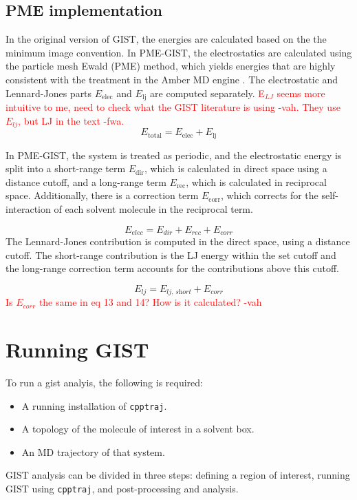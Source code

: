 \documentclass[9pt,tutorial]{livecoms}
\newcommand{\software}{\texttt}
\newcommand{\todo}{\textcolor{red}}
\begin{document}
\subsection{PME implementation}

In the original version of GIST, the energies are calculated based on the the minimum image convention.
In PME-GIST, the electrostatics are calculated using the particle mesh Ewald (PME) method, which yields energies that are highly consistent with the treatment in the Amber MD engine \cite{Chen2021}.
The electrostatic and Lennard-Jones parts $E_\text{elec}$ and $E_\text{lj}$ are computed separately.
\todo{E$_{LJ}$ seems more intuitive to me, need to check what the GIST literature is using -vah. They use $E_{lj}$, but LJ in the text -fwa.}
\begin{equation}
	E_\text{total} = E_\text{elec} + E_\text{lj}
\end{equation}

In PME-GIST, the system is treated as periodic, and the electrostatic energy is split into a short-range term $E_\text{dir}$, which is calculated in direct space using a distance cutoff, and a long-range term $E_\text{rec}$, which is calculated in reciprocal space.
Additionally, there is a correction term $E_\text{corr}$, which corrects for the self-interaction of each solvent molecule in the reciprocal term.

\begin{equation}
	E_\textit{elec} = E_\textit{dir} + E_\textit{rec} + E_\textit{corr}
\end{equation}
The Lennard-Jones contribution is computed in the direct space, using a distance cutoff. The short-range contribution is the LJ energy within the set cutoff and the long-range correction term accounts for the contributions above this cutoff.

\begin{equation}
	E_\textit{lj} = E_\textit{lj,\ short} +  E_\textit{corr}
\end{equation}
\todo{Is $E_{corr}$ the same in eq 13 and 14? How is it calculated? -vah}

\section{Running GIST}
To run a gist analyis, the following is required:
\begin{itemize}
	\item A running installation of \software{cpptraj}.
	\item A topology of the molecule of interest in a solvent box.
	\item An MD trajectory of that system.
\end{itemize}
GIST analysis can be divided in three steps: defining a region of interest, running GIST using \software{cpptraj}, and post-processing and analysis.
\cite{Ramsey2016}
\end{document}
